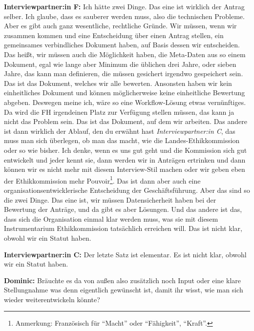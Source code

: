 \documentclass[a4paper,12pt,twoside,numbers=noendperiod]{scrreprt}
\begin{document}
\textbf{Interviewpartner:in F:} Ich hätte zwei Dinge. Das eine ist wirklich der Antrag selber. Ich glaube, dass es sauberer werden muss, also die technischen Probleme. Aber es gibt auch ganz wesentliche, rechtliche Gründe. Wir müssen, wenn wir zusammen kommen und eine Entscheidung über einen Antrag stellen, ein gemeinsames verbindliches Dokument haben, auf Basis dessen wir entscheiden. Das heißt, wir müssen auch die Möglichkeit haben, die Meta-Daten aus so einem Dokument, egal wie lange aber Minimum die üblichen drei Jahre, oder sieben Jahre, das kann man definieren, die müssen gesichert irgendwo gespeichert sein. Das ist das Dokument, welches wir alle bewerten. Ansonsten haben wir kein einheitliches Dokument und können möglicherweise keine einheitliche Bewertung abgeben. Deswegen meine ich, wäre so eine Workflow-Lösung etwas vernünftiges. Da wird die FH irgendeinen Platz zur Verfügung stellen müssen, das kann ja nicht das Problem sein. Das ist das Dokument, auf dem wir arbeiten. Das andere ist dann wirklich der Ablauf, den du erwähnt hast \textit{Interviewpartner:in C}, das muss man sich überlegen, ob man das macht, wie die Landes-Ethikkommission oder so wie bisher. Ich denke, wenn es uns gut geht und die Kommission sich gut entwickelt und jeder kennt sie, dann werden wir in Anträgen ertrinken und dann können wir es nicht mehr mit diesem Interview-Stil machen oder wir geben eben der Ethikkommission mehr Pouvoir\footnote{Anmerkung: Französisch für \enquote{Macht} oder \enquote{Fähigkeit}, \enquote{Kraft}.}. Das ist dann aber auch eine organisationsentwicklerische Entscheidung der Geschäftsführung. Aber das sind so die zwei Dinge. Das eine ist, wir müssen Datensicherheit haben bei der Bewertung der Anträge, und da gibt es aber Lösungen. Und das andere ist das, dass sich die Organisation einmal klar werden muss, was sie mit diesem Instrumentarium Ethikkommission tatsächlich erreichen will. Das ist nicht klar, obwohl wir ein Statut haben.

\textbf{Interviewpartner:in C:} Der letzte Satz ist elementar. Es ist nicht klar, obwohl wir ein Statut haben.

\textbf{Dominic:} Bräuchte es da von außen also zusätzlich noch Input oder eine klare Stellungnahme was denn eigentlich gewünscht ist, damit ihr wisst, wie man sich wieder weiterentwickeln könnte?
\end{document}
